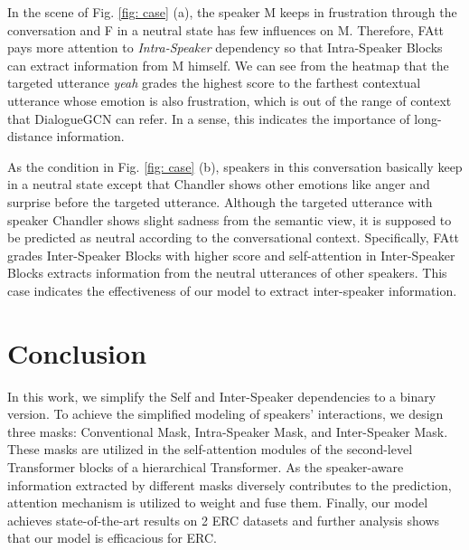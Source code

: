 \documentclass[letterpaper]{article} \usepackage{aaai21}  \usepackage{times}  \usepackage{helvet} \usepackage{courier}  \usepackage[hyphens]{url}  \usepackage{graphicx} \urlstyle{rm} \def\UrlFont{\rm}  \usepackage{natbib}  \usepackage{caption} \usepackage{multirow}
\begin{document}
In the scene of Fig. \ref{fig: case} (a), the speaker M keeps in frustration through the conversation and F in a neutral state has few influences on M. Therefore, FAtt pays more attention to \emph{Intra-Speaker} dependency so that Intra-Speaker Blocks can extract information from M himself. We can see from the heatmap that the targeted utterance \textit{yeah} grades the highest score to the farthest contextual utterance whose emotion is also frustration, which is out of the range of context that DialogueGCN can refer. In a sense, this indicates the importance of long-distance information. 

As the condition in Fig. \ref{fig: case} (b), speakers in this conversation basically keep in a neutral state except that Chandler shows other emotions like anger and surprise before the targeted utterance. Although the targeted utterance with speaker Chandler shows slight sadness from the semantic view, it is supposed to be predicted as neutral according to the conversational context. Specifically, FAtt grades Inter-Speaker Blocks with higher score and self-attention in Inter-Speaker Blocks extracts information from the neutral utterances of other speakers. This case indicates the effectiveness of our model to extract inter-speaker information. 

\section{Conclusion}
In this work, we simplify the Self and Inter-Speaker dependencies to a binary version. To achieve the simplified modeling of speakers' interactions, we design three masks: Conventional Mask, Intra-Speaker Mask, and Inter-Speaker Mask. These masks are utilized in the self-attention modules of the second-level Transformer blocks of a hierarchical Transformer. As the speaker-aware information extracted by different masks diversely contributes to the prediction, attention mechanism is utilized to weight and fuse them. Finally, our model achieves state-of-the-art results on 2 ERC datasets and further analysis shows that our model is efficacious for ERC. 


\end{document}
